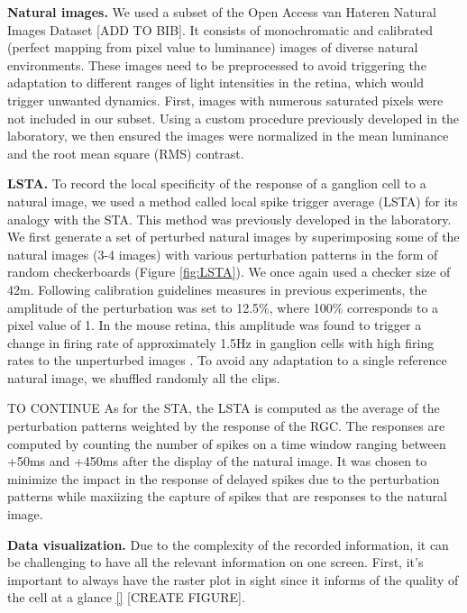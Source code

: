 
\textbf{Natural images.}
We used a subset of the Open Access van Hateren Natural Images Dataset [ADD TO
        BIB]. It consists of monochromatic and calibrated (perfect mapping from
pixel
value to luminance) images of diverse natural environments. These images need
to
be preprocessed to avoid triggering the adaptation to different ranges of light
intensities in the retina, which would trigger unwanted
dynamics. First, images with numerous saturated pixels were not included in our
subset. Using a custom procedure previously developed in the laboratory, we
then
ensured the images were normalized in the mean luminance and the root mean
square (RMS) contrast.

\textbf{LSTA.}
To record the local specificity of the response of a ganglion cell to a natural
image, we used a method called local spike trigger average (LSTA) for its
analogy with the STA. This method was previously developed in the laboratory.
We first generate a set of perturbed natural images by superimposing some of
the natural images (3-4 images) with various perturbation patterns in the form
of random checkerboards (Figure \ref{fig:LSTA}). We once again used a checker
size of 42\textmu m.
Following calibration guidelines measures in previous experiments, the
amplitude of the perturbation was set to 12.5\%, where 100\% corresponds to a
pixel value of 1. In the mouse retina, this amplitude was found to trigger a
change in firing rate of approximately 1.5Hz in ganglion cells with high firing
rates to the unperturbed images \citep{goldin_context-dependent_2022}. To avoid any adaptation to a single reference natural image, we shuffled randomly all the clips.

TO CONTINUE
As for the STA, the LSTA is computed as the average of the perturbation patterns weighted by the response of the RGC. The responses are computed by counting the number of spikes on a time window ranging between +50ms and +450ms after the display of the natural image. It was chosen to minimize the impact in the response of delayed spikes due to the perturbation patterns while maxiizing the capture of spikes that are responses to the natural image.

\textbf{Data visualization.}
Due to the complexity of the recorded information, it can be challenging to
have
all the relevant information on one screen. First, it's important to always
have the raster plot in sight since it informs of the quality of the cell at a
glance \ref{} [CREATE FIGURE].


